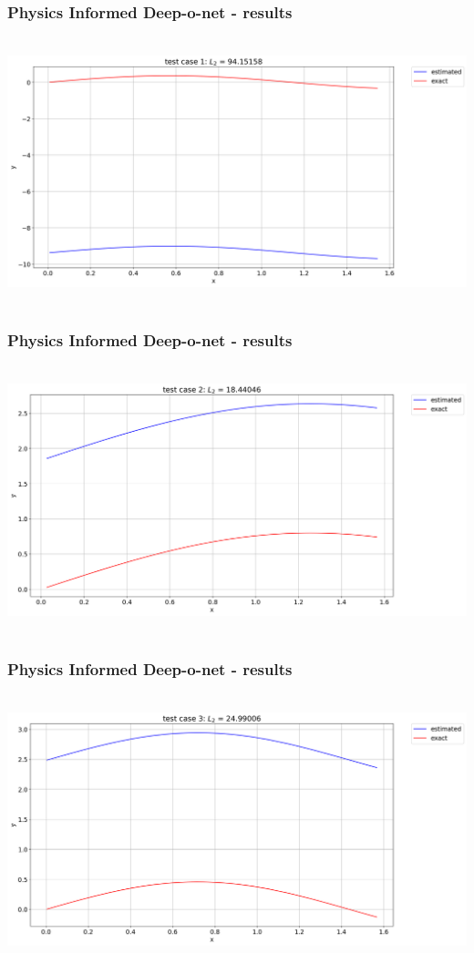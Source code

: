 \begin{frame}
    \frametitle{Physics Informed Deep-o-net - results}
    \hbox{\hspace{-1cm}
        \includegraphics[scale=0.32]{supportingFiles/PI_DON_results/01_originalOutput/test_case_1.png}\hspace{5cm}
    }
\end{frame}

\begin{frame}
    \frametitle{Physics Informed Deep-o-net - results}
    \hbox{\hspace{-1cm}
        \includegraphics[scale=0.32]{supportingFiles/PI_DON_results/01_originalOutput/test_case_2.png}\hspace{5cm}
    }
\end{frame}

\begin{frame}
    \frametitle{Physics Informed Deep-o-net - results}
    \hbox{\hspace{-1cm}
        \includegraphics[scale=0.32]{supportingFiles/PI_DON_results/01_originalOutput/test_case_3.png}\hspace{5cm}
    }
\end{frame}

